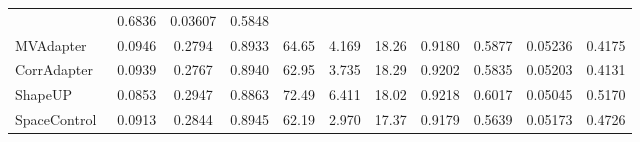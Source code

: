 \begin{table}[t!]
\begin{tabular*}{\textwidth}{@{\extracolsep{\fill}}l|*{10}{c}@{}}
& 0.6836 & 0.03607 & 0.5848 \\
MVAdapter~\cite{huang2025mv}
& 0.0946 & 0.2794 & 0.8933 & 64.65 & 4.169 & 18.26
& 0.9180 & 0.5877 & 0.05236 & 0.4175 \\
CorrAdapter~\cite{zhang2026align}
& 0.0939 & 0.2767 & 0.8940 & 62.95 & 3.735 & 18.29
& 0.9202 & 0.5835 & 0.05203 & 0.4131 \\
ShapeUP~\cite{gat2026shapeup}
& 0.0853 & 0.2947 & 0.8863 & 72.49 & 6.411 & 18.02
& 0.9218 & 0.6017 & 0.05045 & 0.5170 \\
SpaceControl~\cite{fedele2026spacecontrol}
& 0.0913 & 0.2844 & 0.8945 & 62.19 & 2.970 & 17.37
& 0.9179 & 0.5639 & 0.05173 & 0.4726 \\
\bottomrule[0.25mm]
\end{tabular*}
\endgroup
\end{table}
